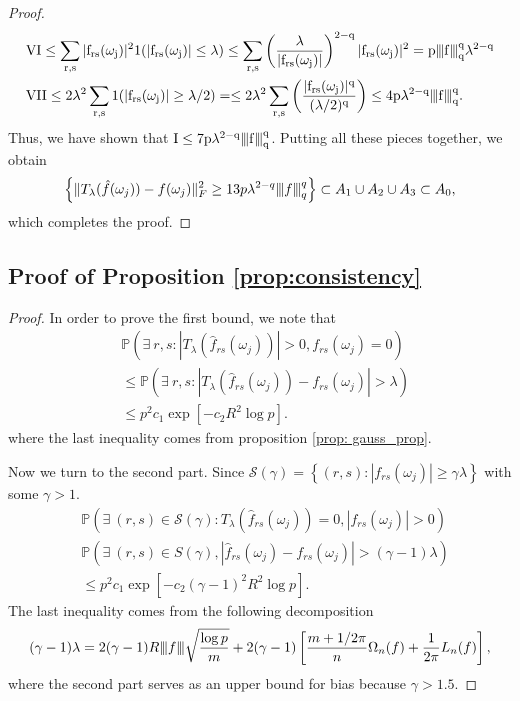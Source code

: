\begin{proof}
\begin{equation*}
\begin{aligned}
& \rm{VI}\le  \sum_{r,s}|f_{rs}(\omega_j)|^2 1(|f_{rs}(\omega_j)|\le \lambda)\le \sum_{r,s} \left(\frac{\lambda}{|f_{rs}(\omega_j)|}\right)^{2-q}|f_{rs}(\omega_j)|^2 = p{\left\vert\kern-0.25ex\left\vert\kern-0.25ex\left\vert f \right\vert\kern-0.25ex\right\vert\kern-0.25ex\right\vert}_q^q \lambda^{2-q}\\
& \rm{VII}\le 2\lambda^2 \sum_{r,s}1(|f_{rs}(\omega_j)|\ge \lambda/2)=\le 2\lambda^2 \sum_{r,s}\left(\frac{|f_{rs}(\omega_j)|^q}{(\lambda/2)^q}\right) \le 4p\lambda^{2-q}{\left\vert\kern-0.25ex\left\vert\kern-0.25ex\left\vert f \right\vert\kern-0.25ex\right\vert\kern-0.25ex\right\vert}_q^q.
\end{aligned}
\end{equation*}
Thus, we have shown that $\rm{I}\le 7p\lambda^{2-q}{\left\vert\kern-0.25ex\left\vert\kern-0.25ex\left\vert f \right\vert\kern-0.25ex\right\vert\kern-0.25ex\right\vert}_q^q$. Putting all these pieces together, we obtain 
\begin{equation}
\left\{\|T_\lambda(\hat{f}(\omega_j))-f(\omega_j)\|_F^2\ge 13p\lambda^{2-q}{\left\vert\kern-0.25ex\left\vert\kern-0.25ex\left\vert f \right\vert\kern-0.25ex\right\vert\kern-0.25ex\right\vert}_q^q\right\} \subset  A_1\cup A_2 \cup A_3 \subset A_0, \nonumber
\end{equation}
which completes the proof. 
\end{proof}


\subsection{Proof of Proposition \ref{prop:consistency}}
\begin{proof}
In order to prove the first bound, we note that 
\begin{equation*}
\begin{aligned}
&\mathbb{P}\left(\exists ~r,s : |T_\lambda(\hat{f}_{rs}(\omega_j))|>0, f_{rs}(\omega_j)=0\right)\\
& \le \mathbb{P}\left(\exists ~r,s : |T_\lambda(\hat{f}_{rs}(\omega_j))-f_{rs}(\omega_j)|>\lambda \right)\\
&\le p^2 c_1\exp[-c_2R^2 \log p].
\end{aligned}
\end{equation*}
where the last inequality comes from proposition \ref{prop: gauss_prop}. 

Now we turn to the second part. Since $\mathcal{S}(\gamma) = \left\{(r,s):|f_{rs}(\omega_j)|\ge \gamma \lambda \right\}$ with some $\gamma>1$. 
\begin{equation*}
\begin{aligned}
& \mathbb{P}\left(\exists ~(r,s) \in \mathcal{S}(\gamma) : T_\lambda(\hat{f}_{rs}(\omega_j))=0, |f_{rs}(\omega_j)| >0\right)\\
& \mathbb{P}\left(\exists ~(r,s) \in S(\gamma), |\hat{f}_{rs}(\omega_j)-f_{rs}(\omega_j)| >(\gamma-1)\lambda\right)\\
&\le p^2 c_1\exp[-c_2 (\gamma-1)^2R^2 \log p].
\end{aligned}
\end{equation*}
The last inequality comes from the following decomposition  
\begin{equation}
(\gamma-1)\lambda = 2(\gamma-1)R {\left\vert\kern-0.25ex\left\vert\kern-0.25ex\left\vert f \right\vert\kern-0.25ex\right\vert\kern-0.25ex\right\vert}\sqrt{\frac{\log p}{m}} +2(\gamma-1)\left[ \frac{m+1/2\pi}{n}\Omega_n(f)+\frac{1}{2\pi}L_n(f)\right], \nonumber
\end{equation}
where the second part serves as an upper bound for bias because $\gamma>1.5$.
\end{proof}

